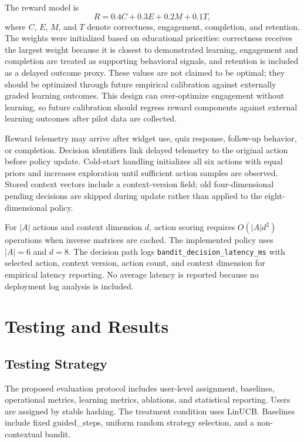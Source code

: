 \documentclass[conference]{IEEEtran}
\begin{document}
The reward model is
\begin{equation}
R = 0.4C + 0.3E + 0.2M + 0.1T,
\end{equation}
where $C$, $E$, $M$, and $T$ denote correctness, engagement, completion, and retention. The weights were initialized based on educational priorities: correctness receives the largest weight because it is closest to demonstrated learning, engagement and completion are treated as supporting behavioral signals, and retention is included as a delayed outcome proxy. These values are not claimed to be optimal; they should be optimized through future empirical calibration against externally graded learning outcomes. This design can over-optimize engagement without learning, so future calibration should regress reward components against external learning outcomes after pilot data are collected.

Reward telemetry may arrive after widget use, quiz response, follow-up behavior, or completion. Decision identifiers link delayed telemetry to the original action before policy update. Cold-start handling initializes all six actions with equal priors and increases exploration until sufficient action samples are observed. Stored context vectors include a context-version field; old four-dimensional pending decisions are skipped during update rather than applied to the eight-dimensional policy.

For $|A|$ actions and context dimension $d$, action scoring requires $O(|A|d^2)$ operations when inverse matrices are cached. The implemented policy uses $|A| = 6$ and $d = 8$. The decision path logs \texttt{bandit\_decision\_latency\_ms} with selected action, context version, action count, and context dimension for empirical latency reporting. No average latency is reported because no deployment log analysis is included.

\section{Testing and Results}

\subsection{Testing Strategy}

The proposed evaluation protocol includes user-level assignment, baselines, operational metrics, learning metrics, ablations, and statistical reporting. Users are assigned by stable hashing. The treatment condition uses LinUCB. Baselines include fixed guided\_steps, uniform random strategy selection, and a non-contextual bandit.
\end{document}
